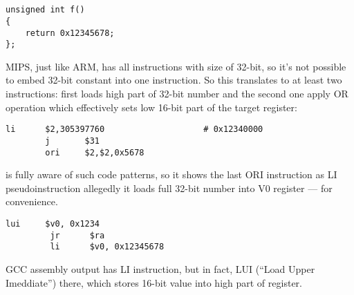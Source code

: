 ﻿\ifx\RUSSIAN\undefined
\section{}

\begin{lstlisting}
unsigned int f()
{
	return 0x12345678;
};
\end{lstlisting}

MIPS, just like ARM, has all instructions with size of 32-bit, so it's not possible to
embed 32-bit constant into one instruction.
So this translates to at least two instructions: 
first loads high part of 32-bit number and the second
one apply OR operation which effectively sets low 16-bit part of the target register:

\begin{lstlisting}[caption=GCC 4.4.5 -O3 (\assemblyOutput)]
        li      $2,305397760                    # 0x12340000
        j       $31
        ori     $2,$2,0x5678
\end{lstlisting}

\IDA is fully aware of such code patterns, so it shows the last ORI instruction as LI pseudoinstruction
allegedly it loads full 32-bit number into V0 register --- for convenience.


\begin{lstlisting}[caption=GCC 4.4.5 -O3 (IDA)]
         lui     $v0, 0x1234
         jr      $ra
         li      $v0, 0x12345678
\end{lstlisting}

GCC assembly output has LI instruction, but in fact, LUI (``Load Upper Imeddiate'') there,
which stores 16-bit value into high part of register.

\fi
